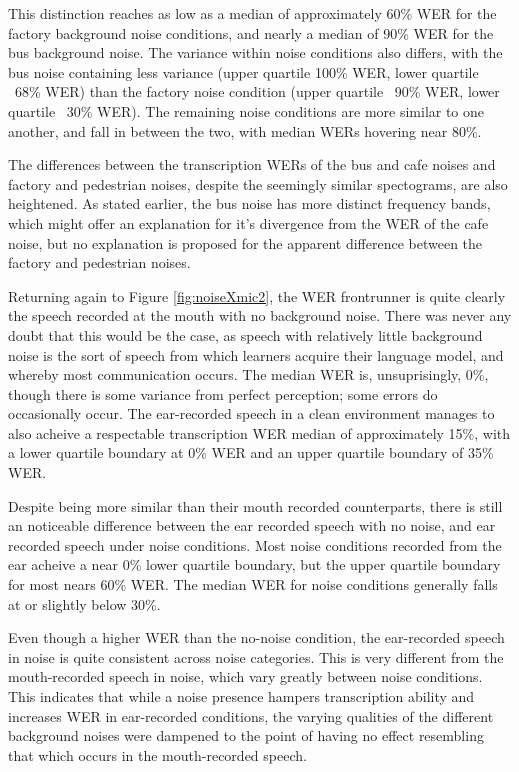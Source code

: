 \documentclass[dissertation,copyright]{uathesis}
\begin{document}
This distinction reaches as low as a median of approximately 60\% WER for the factory background noise conditions, and nearly a median of 90\% WER for the bus background noise.  The variance within noise conditions also differs, with the bus noise containing less variance (upper quartile 100\% WER, lower quartile ~68\% WER) than the factory noise condition (upper quartile ~90\% WER, lower quartile ~30\% WER).  The remaining noise conditions are more similar to one another, and fall in between the two, with median WERs hovering near 80\%.

The differences between the transcription WERs of the bus and cafe noises and factory and pedestrian noises, despite the seemingly similar spectograms, are also heightened.  As stated earlier, the bus noise has more distinct frequency bands, which might offer an explanation for it's divergence from the WER of the cafe noise, but no explanation is proposed for the apparent difference between the factory and pedestrian noises.

Returning again to Figure \ref{fig:noiseXmic2}, the WER frontrunner is quite clearly the speech recorded at the mouth with no background noise.  There was never any doubt that this would be the case, as speech with relatively little background noise is the sort of speech from which learners acquire their language model, and whereby most communication occurs.  The median WER is, unsuprisingly, 0\%, though there is some variance from perfect perception; some errors do occasionally occur. The ear-recorded speech in a clean environment manages to also acheive a respectable transcription WER median of approximately 15\%, with a lower quartile boundary at 0\% WER and an upper quartile boundary of 35\% WER.

Despite being more similar than their mouth recorded counterparts, there is still an noticeable difference between the ear recorded speech with no noise, and ear recorded speech under noise conditions.  Most noise conditions recorded from the ear acheive a near 0\% lower quartile boundary, but the upper quartile boundary for most nears 60\% WER.  The median WER for noise conditions generally falls at or slightly below 30\%. 

Even though a higher WER than the no-noise condition, the ear-recorded speech in noise is quite consistent across noise categories.  This is very different from the mouth-recorded speech in noise, which vary greatly between noise conditions.  This indicates that while a noise presence hampers transcription ability and increases WER in ear-recorded conditions, the varying qualities of the different background noises were dampened to the point of having no effect resembling that which occurs in the mouth-recorded speech.
\end{document}
